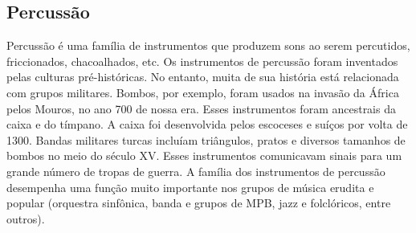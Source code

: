\subsection*{Percussão}

Percussão é uma família de instrumentos que produzem sons ao
serem percutidos, friccionados, chacoalhados, etc. Os instrumentos de
percussão foram inventados pelas culturas pré-históricas. No entanto,
muita de sua história está relacionada com grupos militares. Bombos,
por exemplo, foram usados na invasão da África pelos Mouros, no ano
700 de nossa era. Esses instrumentos foram ancestrais da caixa e do
tímpano. A caixa foi desenvolvida pelos escoceses e suíços por volta
de 1300. Bandas militares turcas incluíam triângulos, pratos e
diversos tamanhos de bombos no meio do século XV. Esses instrumentos
comunicavam sinais para um grande número de tropas de guerra. A
família dos instrumentos de percussão desempenha uma função muito
importante nos grupos de música erudita e popular (orquestra
sinfônica, banda e grupos de MPB, jazz e folclóricos, entre outros).
